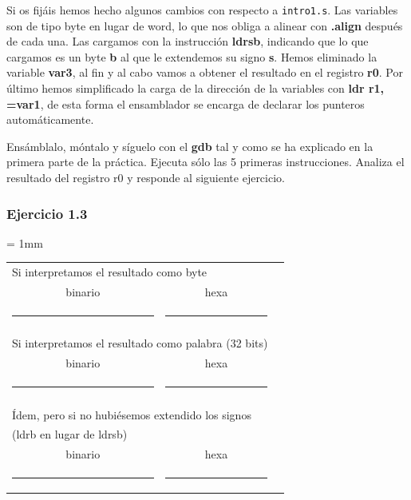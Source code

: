 Si os fijáis hemos hecho algunos cambios con respecto a {\tt intro1.s}. Las
variables son de tipo byte en lugar de word, lo que nos obliga a
alinear con {\bf .align} después de cada una. Las cargamos con la
instrucción {\bf ldrsb}, indicando que lo que cargamos es un byte {\bf b}
al que le extendemos su signo {\bf s}. Hemos eliminado la variable {\bf var3},
al fin y al cabo vamos a obtener el resultado en el registro {\bf r0}.
Por último hemos simplificado la carga de la dirección de la variables
con {\bf ldr r1, =var1}, de esta forma el ensamblador se encarga de declarar los
punteros automáticamente.

Ensámblalo, móntalo y síguelo con el {\bf gdb} tal y como se ha explicado en
la primera parte de la práctica. Ejecuta sólo las 5 primeras instrucciones.
Analiza el resultado del registro r0 y responde al siguiente ejercicio.

\subsubsection{Ejercicio 1.3}

\begin{center}
\small
\colorbox[gray]{0.9}{
\tabcolsep = 1mm
\begin{tabular}{rccc}
\multicolumn{3}{l}{Si interpretamos el resultado como byte}\\
\multicolumn{2}{c}{binario} & hexa \\
\multicolumn{2}{c}{\colorbox[gray]{1}{\rule{6cm}{0cm}\rule{0cm}{0.46cm}}}
& \colorbox[gray]{1}{\rule{2cm}{0cm}\rule{0cm}{0.46cm}} \\
\multicolumn{3}{l}{}\\
\multicolumn{3}{l}{Si interpretamos el resultado como palabra (32 bits)}\\
\multicolumn{2}{c}{binario} & hexa \\
\multicolumn{2}{c}{\colorbox[gray]{1}{\rule{6cm}{0cm}\rule{0cm}{0.46cm}}}
& \colorbox[gray]{1}{\rule{2cm}{0cm}\rule{0cm}{0.46cm}} \\
\multicolumn{3}{l}{}\\
\multicolumn{3}{l}{Ídem, pero si no hubiésemos extendido los signos}\\
\multicolumn{3}{l}{(ldrb en lugar de ldrsb)}\\
\multicolumn{2}{c}{binario} & hexa \\
\multicolumn{2}{c}{\colorbox[gray]{1}{\rule{6cm}{0cm}\rule{0cm}{0.46cm}}}
& \colorbox[gray]{1}{\rule{2cm}{0cm}\rule{0cm}{0.46cm}} \\
\end{tabular}
}
\end{center}


